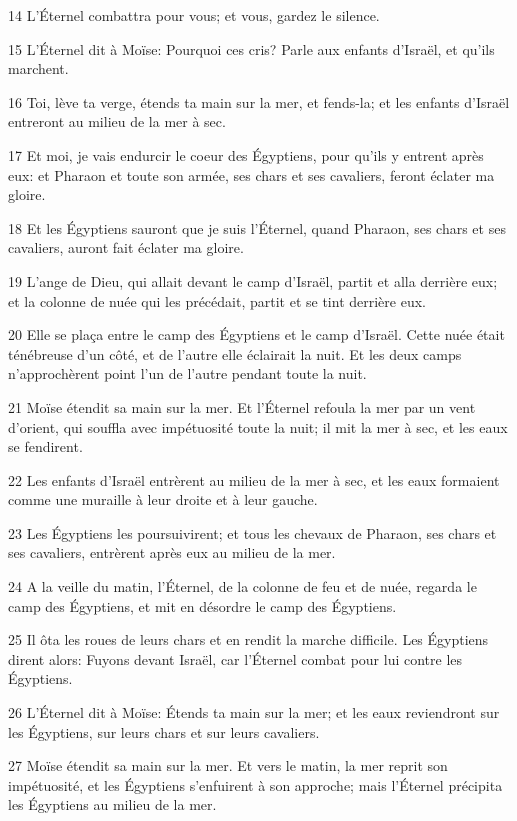 \par 14 L'Éternel combattra pour vous; et vous, gardez le silence.
\par 15 L'Éternel dit à Moïse: Pourquoi ces cris? Parle aux enfants d'Israël, et qu'ils marchent.
\par 16 Toi, lève ta verge, étends ta main sur la mer, et fends-la; et les enfants d'Israël entreront au milieu de la mer à sec.
\par 17 Et moi, je vais endurcir le coeur des Égyptiens, pour qu'ils y entrent après eux: et Pharaon et toute son armée, ses chars et ses cavaliers, feront éclater ma gloire.
\par 18 Et les Égyptiens sauront que je suis l'Éternel, quand Pharaon, ses chars et ses cavaliers, auront fait éclater ma gloire.
\par 19 L'ange de Dieu, qui allait devant le camp d'Israël, partit et alla derrière eux; et la colonne de nuée qui les précédait, partit et se tint derrière eux.
\par 20 Elle se plaça entre le camp des Égyptiens et le camp d'Israël. Cette nuée était ténébreuse d'un côté, et de l'autre elle éclairait la nuit. Et les deux camps n'approchèrent point l'un de l'autre pendant toute la nuit.
\par 21 Moïse étendit sa main sur la mer. Et l'Éternel refoula la mer par un vent d'orient, qui souffla avec impétuosité toute la nuit; il mit la mer à sec, et les eaux se fendirent.
\par 22 Les enfants d'Israël entrèrent au milieu de la mer à sec, et les eaux formaient comme une muraille à leur droite et à leur gauche.
\par 23 Les Égyptiens les poursuivirent; et tous les chevaux de Pharaon, ses chars et ses cavaliers, entrèrent après eux au milieu de la mer.
\par 24 A la veille du matin, l'Éternel, de la colonne de feu et de nuée, regarda le camp des Égyptiens, et mit en désordre le camp des Égyptiens.
\par 25 Il ôta les roues de leurs chars et en rendit la marche difficile. Les Égyptiens dirent alors: Fuyons devant Israël, car l'Éternel combat pour lui contre les Égyptiens.
\par 26 L'Éternel dit à Moïse: Étends ta main sur la mer; et les eaux reviendront sur les Égyptiens, sur leurs chars et sur leurs cavaliers.
\par 27 Moïse étendit sa main sur la mer. Et vers le matin, la mer reprit son impétuosité, et les Égyptiens s'enfuirent à son approche; mais l'Éternel précipita les Égyptiens au milieu de la mer.
